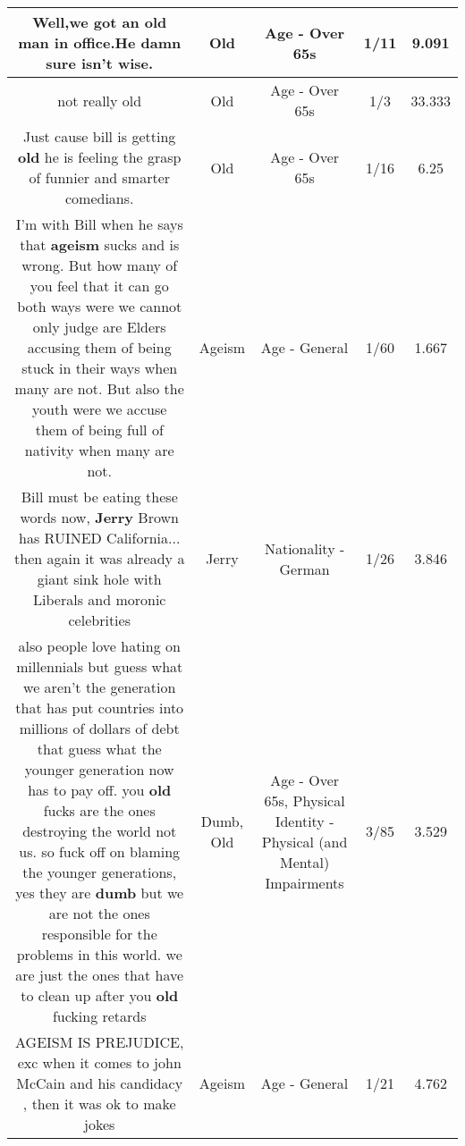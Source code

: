 \documentclass[11pt]{article}
\newlength\mylength
\begin{document}
\begin{center}
\begin{longtable}{|C{.65\mylength}|C{.30\mylength}|C{.12\mylength}|C{.12\mylength}|C{.12\mylength}|}
  \small Well,we got an \textbf{old} man in office.He damn sure isn't wise.\normalsize   & Old & Age - Over 65s & 1/11 & 9.091 \\  \hline
  \small not really old\normalsize   & Old & Age - Over 65s & 1/3 & 33.333 \\  \hline
  \small Just cause bill is getting \textbf{old} he is feeling the grasp of funnier and smarter comedians.\normalsize   & Old & Age - Over 65s & 1/16 & 6.25 \\  \hline
  \small I'm with Bill when he says that \textbf{ageism} sucks and is wrong. But how many of you feel that it can go both ways were we cannot only judge are Elders accusing them of being stuck in their ways when many are not. But also the youth were we accuse them of being full of nativity when many are not.\normalsize   & Ageism & Age - General & 1/60 & 1.667 \\  \hline
  \small Bill must be eating these words now, \textbf{Jerry} Brown has RUINED California... then again it was already a giant sink hole with Liberals and moronic celebrities\normalsize   & Jerry & Nationality - German & 1/26 & 3.846 \\  \hline
  \small also people love hating on millennials but guess what we aren't the generation that has put countries into millions of dollars of debt that guess what the younger generation now has to pay off. you \textbf{old} fucks are the ones destroying the world not us. so fuck off on blaming the younger generations, yes they are \textbf{dumb} but we are not the ones responsible for the problems in this world. we are just the ones that have to clean up after you \textbf{old} fucking retards\normalsize   & Dumb, Old & Age - Over 65s, Physical Identity - Physical (and Mental) Impairments & 3/85 & 3.529 \\  \hline
  \small AGEISM IS PREJUDICE, exc when it comes to john McCain and his candidacy , then it was ok to make jokes\normalsize   & Ageism & Age - General & 1/21 & 4.762 \\  \hline

\end{longtable}
\end{center}
\end{document}
